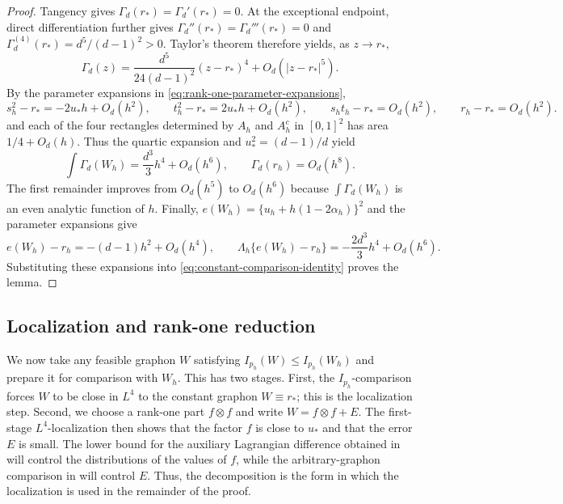 \begin{proof}
Tangency gives $\Gamma_d(r_*)=\Gamma_d'(r_*)=0$.  At the exceptional
endpoint, direct differentiation further gives
$\Gamma_d''(r_*)=\Gamma_d'''(r_*)=0$ and
$\Gamma_d^{(4)}(r_*)=d^5/(d-1)^2>0$.
Taylor's theorem therefore yields, as $z\to r_*$,
\begin{equation}\label{eq:endpoint-gap-expansion}
  \Gamma_d(z)
  =\frac{d^5}{24(d-1)^2}(z-r_*)^4+O_d(|z-r_*|^5).
\end{equation}
By the parameter expansions in \eqref{eq:rank-one-parameter-expansions},
\[
  s_h^2-r_*=-2u_*h+O_d(h^2),
  \qquad
  t_h^2-r_*=2u_*h+O_d(h^2),
  \qquad
  s_ht_h-r_*=O_d(h^2),
  \qquad
  r_h-r_*=O_d(h^2).
\]
and each of the four rectangles determined by $A_h$ and $A_h^c$ in
$[0,1]^2$ has area $1/4+O_d(h)$.
Thus the quartic expansion and $u_*^2=(d-1)/d$ yield
\begin{equation}\label{eq:family-gap-expansion}
  \int\Gamma_d(W_h)=\frac{d^3}{3}h^4+O_d(h^6),
  \qquad
  \Gamma_d(r_h)=O_d(h^8).
\end{equation}
The first remainder improves from $O_d(h^5)$ to $O_d(h^6)$
because $\int\Gamma_d(W_h)$ is an even analytic function of $h$.
Finally, $e(W_h)=\{u_h+h(1-2\alpha_h)\}^2$ and the parameter expansions give
\[
  e(W_h)-r_h=-(d-1)h^2+O_d(h^4),
  \qquad
  \Lambda_h\{e(W_h)-r_h\}=-\frac{2d^3}{3}h^4+O_d(h^6).
\]
Substituting these expansions into \eqref{eq:constant-comparison-identity}
proves the lemma.
\end{proof}


\subsection{Localization and rank-one reduction}
\label{sec:localization-rank-one}

We now take any feasible graphon $W$ satisfying
$I_{p_h}(W)\le I_{p_h}(W_h)$ and prepare it for comparison with $W_h$.
This has two stages.  First, the $I_{p_h}$-comparison forces $W$ to be close
in $L^4$ to the constant graphon $W\equiv r_*$; this is the localization
step.  Second, we choose a rank-one part $f\otimes f$ and write
$W=f\otimes f+E$.  The first-stage $L^4$-localization then shows that the factor
$f$ is close to $u_*$ and that the error $E$ is small.  The lower bound for
the auxiliary Lagrangian difference obtained in
 will control the distributions of
the values of $f$, while the arbitrary-graphon comparison in
 will control $E$.
Thus, the decomposition is the form in which the localization is used in the
remainder of the proof.

